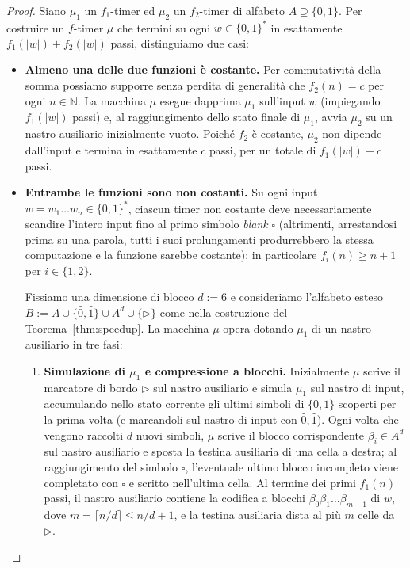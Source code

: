 \begin{proof}
Siano $\mu_1$ un $f_1$-timer ed $\mu_2$ un $f_2$-timer di alfabeto $A \supseteq \{0,1\}$. Per costruire un $f$-timer $\mu$ che termini su ogni $w \in \{0,1\}^*$ in esattamente $f_1(|w|)+f_2(|w|)$ passi, distinguiamo due casi:

\begin{itemize}
    \item \textbf{Almeno una delle due funzioni \`e costante.} Per commutativit\`a della somma possiamo supporre senza perdita di generalit\`a che $f_2(n) = c$ per ogni $n \in \mathbb{N}$. La macchina $\mu$ esegue dapprima $\mu_1$ sull'input $w$ (impiegando $f_1(|w|)$ passi) e, al raggiungimento dello stato finale di $\mu_1$, avvia $\mu_2$ su un nastro ausiliario inizialmente vuoto. Poich\'e $f_2$ \`e costante, $\mu_2$ non dipende dall'input e termina in esattamente $c$ passi, per un totale di $f_1(|w|) + c$ passi.

    \item \textbf{Entrambe le funzioni sono non costanti.} Su ogni input $w = w_1 \dots w_n \in \{0,1\}^*$, ciascun timer non costante deve necessariamente scandire l'intero input fino al primo simbolo \textit{blank} $\square$ (altrimenti, arrestandosi prima su una parola, tutti i suoi prolungamenti produrrebbero la stessa computazione e la funzione sarebbe costante); in particolare $f_i(n) \ge n+1$ per $i \in \{1,2\}$.

    Fissiamo una dimensione di blocco $d := 6$ e consideriamo l'alfabeto esteso $B := A \cup \{\hat{0},\hat{1}\} \cup A^d \cup \{\triangleright\}$ come nella costruzione del Teorema~\ref{thm:speedup}. La macchina $\mu$ opera dotando $\mu_1$ di un nastro ausiliario in tre fasi:
    \begin{enumerate}
        \item \textbf{Simulazione di $\mu_1$ e compressione a blocchi.} Inizialmente $\mu$ scrive il marcatore di bordo $\triangleright$ sul nastro ausiliario e simula $\mu_1$ sul nastro di input, accumulando nello stato corrente gli ultimi simboli di $\{0,1\}$ scoperti per la prima volta (e marcandoli sul nastro di input con $\hat{0},\hat{1}$). Ogni volta che vengono raccolti $d$ nuovi simboli, $\mu$ scrive il blocco corrispondente $\beta_i \in A^d$ sul nastro ausiliario e sposta la testina ausiliaria di una cella a destra; al raggiungimento del simbolo $\square$, l'eventuale ultimo blocco incompleto viene completato con $\square$ e scritto nell'ultima cella. Al termine dei primi $f_1(n)$ passi, il nastro ausiliario contiene la codifica a blocchi $\beta_0 \beta_1 \dots \beta_{m-1}$ di $w$, dove $m = \lceil n/d \rceil \le n/d + 1$, e la testina ausiliaria dista al pi\`u $m$ celle da $\triangleright$.


\end{enumerate}
\end{itemize}
\end{proof}
